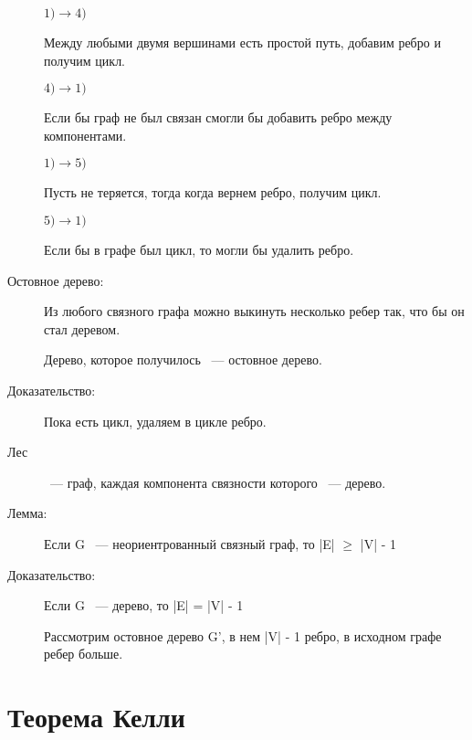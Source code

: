 \documentclass[12pt]{article}
\begin{document}
\begin{description}
$1) \to 4)$

Между любыми двумя вершинами есть простой путь, добавим ребро и получим цикл.

$4) \to 1)$ 

Если бы граф не был связан смогли бы добавить ребро между компонентами.


$1) \to 5)$

Пусть не теряется, тогда когда вернем ребро, получим цикл.

$5) \to 1)$

Если бы в графе был цикл, то могли бы удалить ребро.

\item[Остовное дерево:] Из любого связного графа можно выкинуть несколько ребер так, что бы он стал деревом.

Дерево, которое получилось ~--- остовное дерево. 

\item[Доказательство:] Пока есть цикл, удаляем в цикле ребро. 

\item[Лес]~--- граф, каждая компонента связности которого ~--- дерево. 

\item[Лемма:] Если G ~--- неориентрованный связный граф, то |E| $\ge$ |V| - 1
\item[Доказательство:] Если G ~--- дерево, то |E| = |V| - 1

Рассмотрим остовное дерево G', в нем |V| - 1 ребро, в исходном графе ребер больше. 
\end{description}

\section{Теорема Келли}
\end{document}
